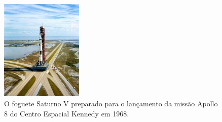 

\begin{figure}[ht]
    \centering
    \caption{O foguete Saturno V preparado para o lançamento da missão Apollo 8 do Centro Espacial Kennedy em 1968.}
    \begin{center}
        \includegraphics[width=0.35\textwidth]{img/saturn V.jpg}
    \end{center}
    \vspace{-0.5cm}
    \label{fig:Saturno-V}
\end{figure}
